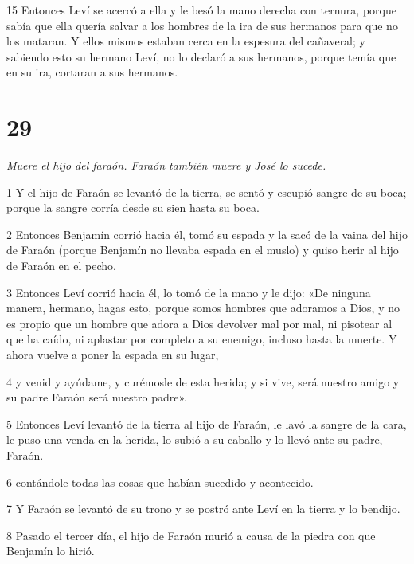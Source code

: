 \par 15 Entonces Leví se acercó a ella y le besó la mano derecha con ternura, porque sabía que ella quería salvar a los hombres de la ira de sus hermanos para que no los mataran. Y ellos mismos estaban cerca en la espesura del cañaveral; y sabiendo esto su hermano Leví, no lo declaró a sus hermanos, porque temía que en su ira, cortaran a sus hermanos.

\chapter{29}

\par \textit{Muere el hijo del faraón. Faraón también muere y José lo sucede.}

\par 1 Y el hijo de Faraón se levantó de la tierra, se sentó y escupió sangre de su boca; porque la sangre corría desde su sien hasta su boca.

\par 2 Entonces Benjamín corrió hacia él, tomó su espada y la sacó de la vaina del hijo de Faraón (porque Benjamín no llevaba espada en el muslo) y quiso herir al hijo de Faraón en el pecho.

\par 3 Entonces Leví corrió hacia él, lo tomó de la mano y le dijo: «De ninguna manera, hermano, hagas esto, porque somos hombres que adoramos a Dios, y no es propio que un hombre que adora a Dios devolver mal por mal, ni pisotear al que ha caído, ni aplastar por completo a su enemigo, incluso hasta la muerte. Y ahora vuelve a poner la espada en su lugar,

\par 4 y venid y ayúdame, y curémosle de esta herida; y si vive, será nuestro amigo y su padre Faraón será nuestro padre».

\par 5 Entonces Leví levantó de la tierra al hijo de Faraón, le lavó la sangre de la cara, le puso una venda en la herida, lo subió a su caballo y lo llevó ante su padre, Faraón.

\par 6 contándole todas las cosas que habían sucedido y acontecido.

\par 7 Y Faraón se levantó de su trono y se postró ante Leví en la tierra y lo bendijo.

\par 8 Pasado el tercer día, el hijo de Faraón murió a causa de la piedra con que Benjamín lo hirió.

